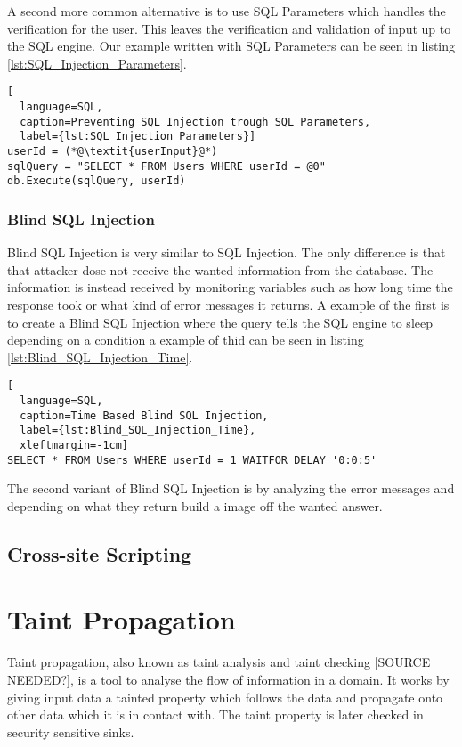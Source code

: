 A second more common alternative is to use SQL Parameters which handles the verification for the user. This leaves the verification and validation of input up to the SQL engine. Our example written with SQL Parameters can be seen in listing \ref{lst:SQL_Injection_Parameters}.

\hfill
\begin{lstlisting}[
  language=SQL,
  caption=Preventing SQL Injection trough SQL Parameters,
  label={lst:SQL_Injection_Parameters}]
userId = (*@\textit{userInput}@*)
sqlQuery = "SELECT * FROM Users WHERE userId = @0"
db.Execute(sqlQuery, userId)
\end{lstlisting}
\hfill


\subsubsection{Blind SQL Injection}
Blind SQL Injection is very similar to SQL Injection. The only difference is that that attacker dose not receive the wanted information from the database. The information is instead received by monitoring variables such as how long time the response took or what kind of error messages it returns. A example of the first is to create a Blind SQL Injection where the query tells the SQL engine to sleep depending on a condition a example of thid can be seen in listing \ref{lst:Blind_SQL_Injection_Time}. \parencite{JustinClarke-Salt2009SIAa, Secure_Web} 

\hfill
\begin{lstlisting}[
  language=SQL,
  caption=Time Based Blind SQL Injection,
  label={lst:Blind_SQL_Injection_Time},
  xleftmargin=-1cm]
SELECT * FROM Users WHERE userId = 1 WAITFOR DELAY '0:0:5'
\end{lstlisting}
\hfill

The second variant of Blind SQL Injection is by analyzing the error messages and depending on what they return build a image off the wanted answer. \parencite{JustinClarke-Salt2009SIAa, Secure_Web} 

\subsection{Cross-site Scripting}


\section{Taint Propagation}
Taint propagation, also known as taint analysis and taint checking [SOURCE NEEDED?], is a tool to analyse the flow of information in a domain. \parencite{Pan2015} It works by giving input data a tainted property which follows the data and propagate onto other data which it is in contact with. The taint property is later checked in security sensitive sinks. \parencite{Pan2015}

